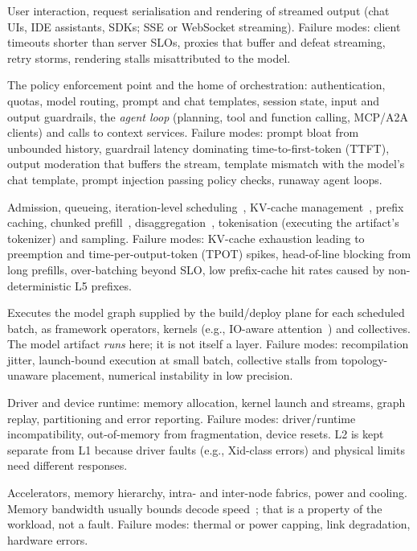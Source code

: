 \documentclass[11pt]{article}
\begin{document}
\begin{description}[leftmargin=0.6cm, itemsep=3pt, style=unboxed]
\item[L6 Application.] User interaction, request serialisation and rendering of streamed output (chat UIs, IDE assistants, SDKs; SSE or WebSocket streaming). Failure modes: client timeouts shorter than server SLOs, proxies that buffer and defeat streaming, retry storms, rendering stalls misattributed to the model.
\item[L5 Orchestration \& Gateway.] The policy enforcement point and the home of orchestration: authentication, quotas, model routing, prompt and chat templates, session state, input and output guardrails, the \emph{agent loop} (planning, tool and function calling, MCP/A2A clients) and calls to context services. Failure modes: prompt bloat from unbounded history, guardrail latency dominating time-to-first-token (TTFT), output moderation that buffers the stream, template mismatch with the model's chat template, prompt injection passing policy checks, runaway agent loops.
\item[L4 Serving Engine.] Admission, queueing, iteration-level scheduling~\cite{yu2022orca}, KV-cache management~\cite{kwon2023paged}, prefix caching, chunked prefill~\cite{agrawal2023sarathi}, disaggregation~\cite{zhong2024distserve}, tokenisation (executing the artifact's tokenizer) and sampling. Failure modes: KV-cache exhaustion leading to preemption and time-per-output-token (TPOT) spikes, head-of-line blocking from long prefills, over-batching beyond SLO, low prefix-cache hit rates caused by non-deterministic L5 prefixes.
\item[L3 Model Execution Runtime.] Executes the model graph supplied by the build/deploy plane for each scheduled batch, as framework operators, kernels (e.g., IO-aware attention~\cite{dao2022flash}) and collectives. The model artifact \emph{runs} here; it is not itself a layer. Failure modes: recompilation jitter, launch-bound execution at small batch, collective stalls from topology-unaware placement, numerical instability in low precision.
\item[L2 Device \& Driver.] Driver and device runtime: memory allocation, kernel launch and streams, graph replay, partitioning and error reporting. Failure modes: driver/runtime incompatibility, out-of-memory from fragmentation, device resets. L2 is kept separate from L1 because driver faults (e.g., Xid-class errors) and physical limits need different responses.
\item[L1 Physical Compute \& Interconnect.] Accelerators, memory hierarchy, intra- and inter-node fabrics, power and cooling. Memory bandwidth usually bounds decode speed~\cite{yuan2024roofline}; that is a property of the workload, not a fault. Failure modes: thermal or power capping, link degradation, hardware errors.

\end{description}
\end{document}
